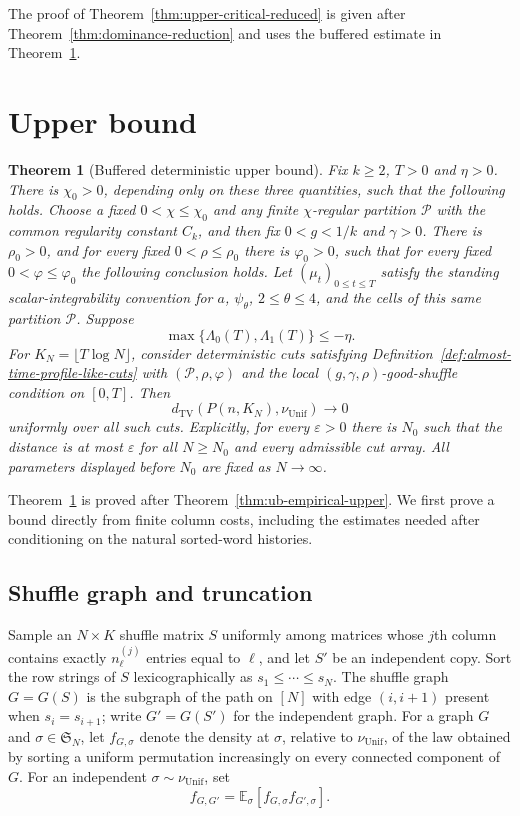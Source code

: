 \documentclass[11pt]{article}
\numberwithin{equation}{section}
\newtheorem{theorem}{Theorem}[section]
\newcommand{\TV}{\mathrm{TV}}
\newcommand{\Unif}{\mathrm{Unif}}
\newcommand{\E}{\mathbb E}
\newcommand{\1}{\mathbf 1}
\newcommand{\nuUnif}{\nu_{\Unif}}
\begin{document}
The proof of Theorem~\ref{thm:upper-critical-reduced} is given after
Theorem~\ref{thm:dominance-reduction} and uses the buffered estimate
in Theorem~\ref{thm:deterministic-upper-bound}.



\section{Upper bound}

\begin{theorem}[Buffered deterministic upper bound]
\label{thm:deterministic-upper-bound}
Fix $k\ge2$, $T>0$ and $\eta>0$.
There is $\chi_0>0$, depending only on these three quantities, such
that the following holds.  Choose a fixed
$0<\chi\le\chi_0$ and any finite $\chi$-regular partition $\mathcal P$
with the common regularity constant $C_k$, and then fix
$0<g<1/k$ and $\gamma>0$.  There is $\rho_0>0$, and
for every fixed $0<\rho\le\rho_0$ there is $\varphi_0>0$, such that
for every fixed $0<\varphi\le\varphi_0$ the following conclusion holds.
Let $(\mu_t)_{0\le t\le T}$ satisfy the standing scalar-integrability
convention for $a$, $\psi_\theta$, $2\le\theta\le4$, and the cells of
this same partition $\mathcal P$.  Suppose
\[
 \max\{\Lambda_0(T),\Lambda_1(T)\}\le-\eta.
\]
For $K_N=\lfloor T\log N\rfloor$, consider deterministic cuts satisfying
Definition~\ref{def:almost-time-profile-like-cuts} with
$(\mathcal P,\rho,\varphi)$ and the local $(g,\gamma,\rho)$-good-shuffle
condition on $[0,T]$.  Then
\[
 d_{\TV}(P(n,K_N),\nuUnif)\longrightarrow0
\]
uniformly over all such cuts.  Explicitly, for every $\varepsilon>0$
there is $N_0$ such that the distance is at most $\varepsilon$ for all
$N\ge N_0$ and every admissible cut array.  All parameters displayed
before $N_0$ are fixed as $N\to\infty$.
\end{theorem}

Theorem~\ref{thm:deterministic-upper-bound} is proved after
Theorem~\ref{thm:ub-empirical-upper}. We first prove a bound directly
from finite column costs, including the estimates needed after
conditioning on the natural sorted-word histories.


\subsection{Shuffle graph and truncation}

Sample an $N\times K$ shuffle matrix $S$ uniformly among matrices whose $j$th
column contains exactly $n_\ell^{(j)}$ entries equal to $\ell$, and let $S'$
be an independent copy. Sort the row strings of $S$ lexicographically as
$s_1\le\cdots\le s_N$. The shuffle graph $G=G(S)$ is the subgraph of the
path on $[N]$ with edge $(i,i+1)$ present when $s_i=s_{i+1}$; write
$G'=G(S')$ for the independent graph. For a graph $G$ and
$\sigma\in\mathfrak S_N$, let $f_{G,\sigma}$ denote the density at
$\sigma$, relative to $\nuUnif$, of the law obtained by sorting a uniform
permutation increasingly on every connected component of $G$. For an
independent $\sigma\sim\nuUnif$, set
\[
  f_{G,G'}=\E_\sigma[f_{G,\sigma}f_{G',\sigma}].
\]
\end{document}
